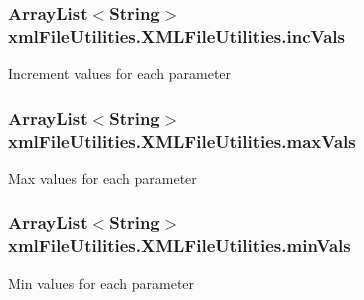 \subsubsection[{inc\+Vals}]{\setlength{\rightskip}{0pt plus 5cm}Array\+List$<$String$>$ xml\+File\+Utilities.\+X\+M\+L\+File\+Utilities.\+inc\+Vals\hspace{0.3cm}{\ttfamily [static]}}\label{classxmlFileUtilities_1_1XMLFileUtilities_aff7782e4e87133c300f459f956acdacf}
Increment values for each parameter \hypertarget{classxmlFileUtilities_1_1XMLFileUtilities_a6db58012fe79cf36d772eda6fc4aa484}{}
\subsubsection[{max\+Vals}]{\setlength{\rightskip}{0pt plus 5cm}Array\+List$<$String$>$ xml\+File\+Utilities.\+X\+M\+L\+File\+Utilities.\+max\+Vals\hspace{0.3cm}{\ttfamily [static]}}\label{classxmlFileUtilities_1_1XMLFileUtilities_a6db58012fe79cf36d772eda6fc4aa484}
Max values for each parameter \hypertarget{classxmlFileUtilities_1_1XMLFileUtilities_a20c1b1d6bf709a9e1aea4cc7e38ec2fe}{}
\subsubsection[{min\+Vals}]{\setlength{\rightskip}{0pt plus 5cm}Array\+List$<$String$>$ xml\+File\+Utilities.\+X\+M\+L\+File\+Utilities.\+min\+Vals\hspace{0.3cm}{\ttfamily [static]}}\label{classxmlFileUtilities_1_1XMLFileUtilities_a20c1b1d6bf709a9e1aea4cc7e38ec2fe}
Min values for each parameter \hypertarget{classxmlFileUtilities_1_1XMLFileUtilities_ae10435eb2f2b4c128b4c658edc8fa2e9}{}
